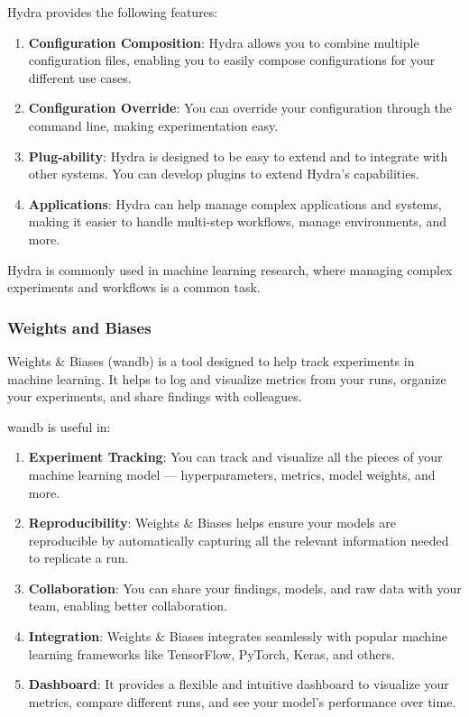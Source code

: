 Hydra provides the following features:
\begin{enumerate}
    \item \textbf{Configuration Composition}: Hydra allows you to combine multiple configuration files, enabling you to easily compose configurations for your different use cases.
    \item \textbf{Configuration Override}: You can override your configuration through the command line, making experimentation easy.
    \item \textbf{Plug-ability}: Hydra is designed to be easy to extend and to integrate with other systems. You can develop plugins to extend Hydra's capabilities.
    \item \textbf{Applications}: Hydra can help manage complex applications and systems, making it easier to handle multi-step workflows, manage environments, and more.
\end{enumerate}
Hydra is commonly used in machine learning research, where managing complex experiments and workflows is a common task.

\subsubsection{Weights and Biases}
Weights \& Biases (wandb) is a tool designed to help track experiments in machine learning. It helps to log and visualize metrics from your runs, organize your experiments, and share findings with colleagues.

wandb is useful in:
\begin{enumerate}
    \item \textbf{Experiment Tracking}: You can track and visualize all the pieces of your machine learning model — hyperparameters, metrics, model weights, and more.
    \item \textbf{Reproducibility}: Weights \& Biases helps ensure your models are reproducible by automatically capturing all the relevant information needed to replicate a run.
    \item \textbf{Collaboration}: You can share your findings, models, and raw data with your team, enabling better collaboration.
    \item \textbf{Integration}: Weights \& Biases integrates seamlessly with popular machine learning frameworks like TensorFlow, PyTorch, Keras, and others.
    \item \textbf{Dashboard}: It provides a flexible and intuitive dashboard to visualize your metrics, compare different runs, and see your model's performance over time.
\end{enumerate}

